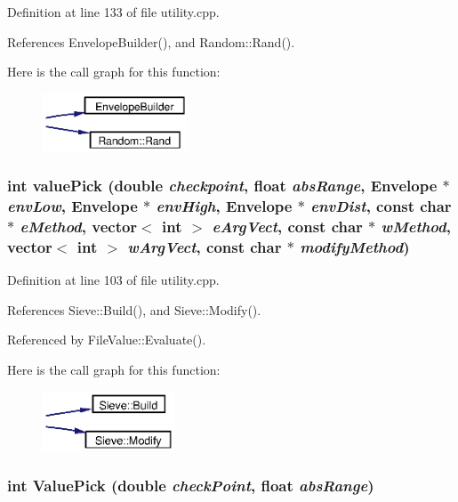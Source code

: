 Definition at line 133 of file utility.cpp.

References Envelope\-Builder(), and Random::Rand().

Here is the call graph for this function:\begin{figure}[H]
\begin{center}
\leavevmode
\includegraphics[width=122pt]{utility_8h_a4_cgraph}
\end{center}
\end{figure}
\subsubsection{\setlength{\rightskip}{0pt plus 5cm}int value\-Pick (double {\em checkpoint}, float {\em abs\-Range}, Envelope $\ast$ {\em env\-Low}, Envelope $\ast$ {\em env\-High}, Envelope $\ast$ {\em env\-Dist}, const char $\ast$ {\em e\-Method}, vector$<$ int $>$ {\em e\-Arg\-Vect}, const char $\ast$ {\em w\-Method}, vector$<$ int $>$ {\em w\-Arg\-Vect}, const char $\ast$ {\em modify\-Method})}\label{utility_8h_a3}




Definition at line 103 of file utility.cpp.

References Sieve::Build(), and Sieve::Modify().

Referenced by File\-Value::Evaluate().

Here is the call graph for this function:\begin{figure}[H]
\begin{center}
\leavevmode
\includegraphics[width=111pt]{utility_8h_a3_cgraph}
\end{center}
\end{figure}
\subsubsection{\setlength{\rightskip}{0pt plus 5cm}int Value\-Pick (double {\em check\-Point}, float {\em abs\-Range})}\label{utility_8h_a2}



